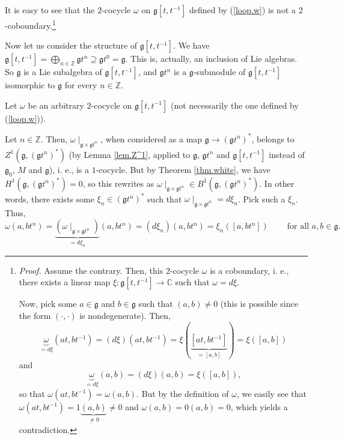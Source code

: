 \documentclass[etingof-lie.tex]{subfiles}
\begin{document}
It is easy to see that the $2$-cocycle $\omega$ on $\mathfrak{g}\left[
t,t^{-1}\right]  $ defined by (\ref{loop.w}) is not a $2$%
-coboundary.\footnote{\textit{Proof.} Assume the contrary. Then, this
$2$-cocycle $\omega$ is a coboundary, i. e., there exists a linear map
$\xi:\mathfrak{g}\left[  t,t^{-1}\right]  \rightarrow\mathbb{C}$ such that
$\omega=d\xi$.
\par
Now, pick some $a\in\mathfrak{g}$ and $b\in\mathfrak{g}$ such that $\left(
a,b\right)  \neq0$ (this is possible since the form $\left(  \cdot
,\cdot\right)  $ is nondegenerate). Then,%
\[
\underbrace{\omega}_{=d\xi}\left(  at,bt^{-1}\right)  =\left(  d\xi\right)
\left(  at,bt^{-1}\right)  =\xi\left(  \underbrace{\left[  at,bt^{-1}\right]
}_{=\left[  a,b\right]  }\right)  =\xi\left(  \left[  a,b\right]  \right)
\]
and%
\[
\underbrace{\omega}_{=d\xi}\left(  a,b\right)  =\left(  d\xi\right)  \left(
a,b\right)  =\xi\left(  \left[  a,b\right]  \right)  ,
\]
so that $\omega\left(  at,bt^{-1}\right)  =\omega\left(  a,b\right)  $. But by
the definition of $\omega$, we easily see that $\omega\left(  at,bt^{-1}%
\right)  =1\underbrace{\left(  a,b\right)  }_{\neq0}\neq0$ and $\omega\left(
a,b\right)  =0\left(  a,b\right)  =0$, which yields a contradiction.}

Now let us consider the structure of $\mathfrak{g}\left[  t,t^{-1}\right]  $.
We have $\mathfrak{g}\left[  t,t^{-1}\right]  =\bigoplus\limits_{n\in
\mathbb{Z}}\mathfrak{g}t^{n}\supseteq\mathfrak{g}t^{0}=\mathfrak{g}$. This is,
actually, an inclusion of Lie algebras. So $\mathfrak{g}$ is a Lie subalgebra
of $\mathfrak{g}\left[  t,t^{-1}\right]  $, and $\mathfrak{g}t^{n}$ is a
$\mathfrak{g}$-submodule of $\mathfrak{g}\left[  t,t^{-1}\right]  $ isomorphic
to $\mathfrak{g}$ for every $n\in\mathbb{Z}$.

Let $\omega$ be an arbitrary $2$-cocycle on $\mathfrak{g}\left[
t,t^{-1}\right]  $ (not necessarily the one defined by (\ref{loop.w})).

Let $n\in\mathbb{Z}$. Then, $\omega\mid_{\mathfrak{g}\times\mathfrak{g}t^{n}}%
$, when considered as a map $\mathfrak{g}\rightarrow\left(  \mathfrak{g}%
t^{n}\right)  ^{\ast}$, belongs to $Z^{1}\left(  \mathfrak{g},\left(
\mathfrak{g}t^{n}\right)  ^{\ast}\right)  $ (by Lemma \ref{lem.Z^1}, applied
to $\mathfrak{g}$, $\mathfrak{g}t^{n}$ and $\mathfrak{g}\left[  t,t^{-1}%
\right]  $ instead of $\mathfrak{g}_{0}$, $M$ and $\mathfrak{g}$), i. e., is a
$1$-cocycle. But by Theorem \ref{thm.white}, we have $H^{1}\left(
\mathfrak{g},\left(  \mathfrak{g}t^{n}\right)  ^{\ast}\right)  =0$, so this
rewrites as $\omega\mid_{\mathfrak{g}\times\mathfrak{g}t^{n}}\in B^{1}\left(
\mathfrak{g},\left(  \mathfrak{g}t^{n}\right)  ^{\ast}\right)  $. In other
words, there exists some $\xi_{n}\in\left(  \mathfrak{g}t^{n}\right)  ^{\ast}$
such that $\omega\mid_{\mathfrak{g}\times\mathfrak{g}t^{n}}=d\xi_{n}$. Pick
such a $\xi_{n}$. Thus,%
\[
\omega\left(  a,bt^{n}\right)  =\underbrace{\left(  \omega\mid_{\mathfrak{g}%
\times\mathfrak{g}t^{n}}\right)  }_{=d\xi_{n}}\left(  a,bt^{n}\right)
=\left(  d\xi_{n}\right)  \left(  a,bt^{n}\right)  =\xi_{n}\left(  \left[
a,bt^{n}\right]  \right)  \ \ \ \ \ \ \ \ \ \ \text{for all }a,b\in
\mathfrak{g}.
\]
\end{document}

